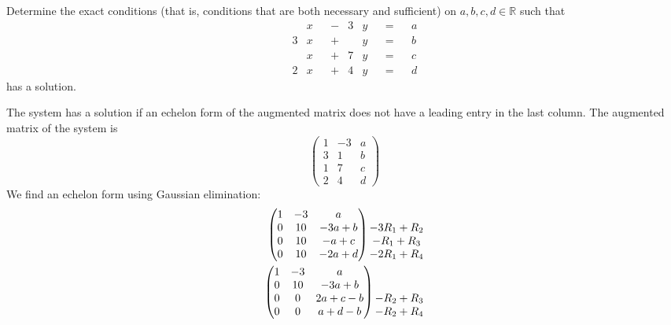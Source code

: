 \documentclass[12pt]{article}
\newenvironment{problem}[2][Problem]
{
	\begin{trivlist} 
		\item[\hskip \labelsep {\bfseries #1 #2:}]
	}
{
	\end{trivlist}
	}
\newenvironment{solution}[1][Solution]
{
	\begin{trivlist} 
		\item[\hskip \labelsep {\itshape #1:}]
	}
	{
	\end{trivlist}
}
\begin{document}
\newpage
\begin{problem}{6}
Determine the exact conditions (that is, conditions that are both necessary and sufficient) on $a,b,c,d \in \mathbb{R}$ such that
\begin{align*}
&&&&&&&&&&&&&&&&&&&&&&&&&&&&&&&& &x&   &-& 3&y&  &=& &a& &&&&&&&&&&&&&&&&&&&&&&&&&&&&&&&&\\
&&&&&&&&&&&&&&&&&&&&&&&&&&&&&&&& 3&x& &+&  &y&   &=& &b& &&&&&&&&&&&&&&&&&&&&&&&&&&&&&&&& \\
&&&&&&&&&&&&&&&&&&&&&&&&&&&&&&&& &x&   &+& 7&y&  &=& &c& &&&&&&&&&&&&&&&&&&&&&&&&&&&&&&&&\\
&&&&&&&&&&&&&&&&&&&&&&&&&&&&&&&& 2&x& &+&  4&y&   &=& &d& &&&&&&&&&&&&&&&&&&&&&&&&&&&&&&&&
\end{align*}
has a solution.
\noindent
\newline
\newline
\begin{solution}
The system has a solution if an echelon form of the augmented matrix does not have a leading entry in the last column. The augmented matrix of the system is
\[
\begin{pmatrix}1&-3&a\\3&1&b\\1&7&c\\2&4&d\end{pmatrix}
\]
We find an echelon form using Gaussian elimination:
\begin{align*}
\begin{pmatrix}1&-3&a\\0&10&-3a+b\\0&10&-a+c\\0&10&-2a+d\end{pmatrix} \begin{matrix} \hphantom{1}\\-3R_1+R_2\\-R_1+R_3\\-2R_1+R_4 \end{matrix}\\
\begin{pmatrix}1&-3&a\\0&10&-3a+b\\0&0&2a+c-b\\0&0&a+d-b\end{pmatrix} \begin{matrix} \hphantom{1}\\ \hphantom{1}\\-R_2+R_3\\-R_2+R_4 \end{matrix}\\

\end{align*}
\end{solution}
\end{problem}
\end{document}
